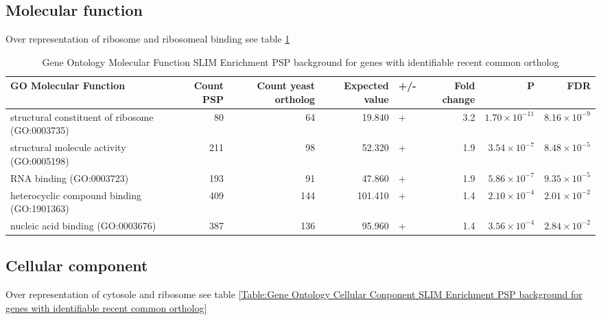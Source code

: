 \subsection{Molecular function}
Over representation of ribosome and ribosomeal binding see table \ref{Table:Gene Ontology Molecular Function SLIM Enrichment PSP background for genes with identifiable recent common ortholog}

\begin{table}[ht]
\centering
\begin{adjustbox}{width=1\textwidth}
\begin{tabular}{lrrrlrrr}
  \hline
GO Molecular Function & Count PSP & Count yeast ortholog & Expected value & +/- & Fold change & P & FDR \\ 
  \hline
structural constituent of ribosome (GO:0003735) & 80 & 64 & 19.840 & + & 3.2 & $1.70 \times 10^{-11}$ & $8.16 \times 10^{-9}$ \\ 
  structural molecule activity (GO:0005198) & 211 & 98 & 52.320 & + & 1.9 & $3.54 \times 10^{-7}$ & $8.48 \times 10^{-5}$ \\ 
  RNA binding (GO:0003723) & 193 & 91 & 47.860 & + & 1.9 & $5.86 \times 10^{-7}$ & $9.35 \times 10^{-5}$ \\ 
  heterocyclic compound binding (GO:1901363) & 409 & 144 & 101.410 & + & 1.4 & $2.10 \times 10^{-4}$ & $2.01 \times 10^{-2}$ \\ 
  nucleic acid binding (GO:0003676) & 387 & 136 & 95.960 & + & 1.4 & $3.56 \times 10^{-4}$ & $2.84 \times 10^{-2}$ \\ 
   \hline
\end{tabular}
\end{adjustbox}
\caption{Gene Ontology Molecular Function SLIM Enrichment PSP background for genes with identifiable recent common ortholog} 
\label{Table:Gene Ontology Molecular Function SLIM Enrichment PSP background for genes with identifiable recent common ortholog}
\end{table}
\subsection{Cellular component}
Over representation of cytosole and ribosome see table \ref{Table:Gene Ontology Cellular Conponent SLIM Enrichment PSP background for genes with identifiable recent common ortholog}

